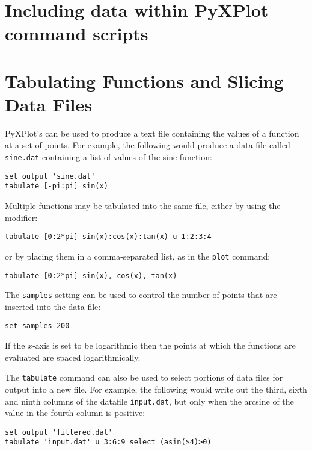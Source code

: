 \section{Including data within PyXPlot command scripts}

\section{Tabulating Functions and Slicing Data Files}

PyXPlot's  can be used to produce a text file containing the
values of a function at a set of points.  For example, the following would
produce a data file called {\tt sine.dat} containing a list of values of the
sine function:

\begin{verbatim}
set output 'sine.dat'
tabulate [-pi:pi] sin(x)
\end{verbatim}

\noindent Multiple functions may be tabulated into the same file, either by
using the  modifier:

\begin{verbatim}
tabulate [0:2*pi] sin(x):cos(x):tan(x) u 1:2:3:4
\end{verbatim}

\noindent or by placing them in a comma-separated list, as in the {\tt plot}
command:

\begin{verbatim}
tabulate [0:2*pi] sin(x), cos(x), tan(x)
\end{verbatim}

The {\tt samples} setting can be used to control the number of points that are
inserted into the data file:

\begin{verbatim}
set samples 200
\end{verbatim}

\noindent If the $x$-axis is set to be logarithmic then the points at which the
functions are evaluated are spaced logarithmically.

The {\tt tabulate} command can also be used to select portions of data files
for output into a new file.  For example, the following would write out the
third, sixth and ninth columns of the datafile {\tt input.dat}, but only when
the arcsine of the value in the fourth column is positive:

\begin{verbatim}
set output 'filtered.dat'
tabulate 'input.dat' u 3:6:9 select (asin($4)>0)
\end{verbatim}

